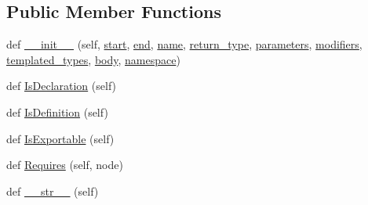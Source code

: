\subsection*{Public Member Functions}
\begin{DoxyCompactItemize}
\item 
def \mbox{\hyperlink{classscripts_1_1generator_1_1cpp_1_1ast_1_1_function_a71d4a01b8cf391120735025d33c9bfcd}{\+\_\+\+\_\+init\+\_\+\+\_\+}} (self, \mbox{\hyperlink{classscripts_1_1generator_1_1cpp_1_1ast_1_1_node_a27ce0a583baee598b75ac6dd21f8575b}{start}}, \mbox{\hyperlink{classscripts_1_1generator_1_1cpp_1_1ast_1_1_node_a8e3394f9dd405352610ff9be4f284e2c}{end}}, \mbox{\hyperlink{classscripts_1_1generator_1_1cpp_1_1ast_1_1___generic_declaration_a7cc4e9a1dace9c627d7fe4ce614a8888}{name}}, \mbox{\hyperlink{classscripts_1_1generator_1_1cpp_1_1ast_1_1_function_a883453721a1ad4500c1103f08ee182ef}{return\+\_\+type}}, \mbox{\hyperlink{classscripts_1_1generator_1_1cpp_1_1ast_1_1_function_a3722158a9f32403cf0380a5d1ba3f035}{parameters}}, \mbox{\hyperlink{classscripts_1_1generator_1_1cpp_1_1ast_1_1_function_a2c3d4f1339ae74225cd691707abc669a}{modifiers}}, \mbox{\hyperlink{classscripts_1_1generator_1_1cpp_1_1ast_1_1_function_a54dbe525d1ce621370e76e8dc0bacae2}{templated\+\_\+types}}, \mbox{\hyperlink{classscripts_1_1generator_1_1cpp_1_1ast_1_1_function_a7dbb61df4b5716e8f14d6547b8798a6a}{body}}, \mbox{\hyperlink{classscripts_1_1generator_1_1cpp_1_1ast_1_1___generic_declaration_a6e7fb8f951551af19f2366876a150817}{namespace}})
\item 
def \mbox{\hyperlink{classscripts_1_1generator_1_1cpp_1_1ast_1_1_function_a4691458ffe4e8c7eb2b4600e30fac3cc}{Is\+Declaration}} (self)
\item 
def \mbox{\hyperlink{classscripts_1_1generator_1_1cpp_1_1ast_1_1_function_a31109994f99bcbd9fff7995a6f99785b}{Is\+Definition}} (self)
\item 
def \mbox{\hyperlink{classscripts_1_1generator_1_1cpp_1_1ast_1_1_function_a1920a361baf96f213a642d0a1a9a43c8}{Is\+Exportable}} (self)
\item 
def \mbox{\hyperlink{classscripts_1_1generator_1_1cpp_1_1ast_1_1_function_ad98d013eccda376cfda87f43c37233b5}{Requires}} (self, node)
\item 
def \mbox{\hyperlink{classscripts_1_1generator_1_1cpp_1_1ast_1_1_function_ac74e47b07fb2cad1b7561a955bf7daf3}{\+\_\+\+\_\+str\+\_\+\+\_\+}} (self)
\end{DoxyCompactItemize}
